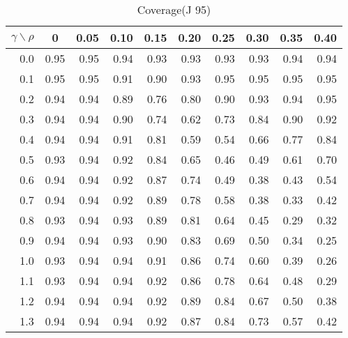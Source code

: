 \documentclass[12pt]{article}
\begin{document}
%
\begin{table}[!tbp]
\caption{Coverage(J 95)}
 \begin{center}
 \begin{tabular}{r|rrrrrrrrr}\hline\hline
\multicolumn{1}{c|}{$\gamma\backslash\rho$}&\multicolumn{1}{c}{0}&\multicolumn{1}{c}{0.05}&\multicolumn{1}{c}{0.10}&\multicolumn{1}{c}{0.15}&\multicolumn{1}{c}{0.20}&\multicolumn{1}{c}{0.25}&\multicolumn{1}{c}{0.30}&\multicolumn{1}{c}{0.35}&\multicolumn{1}{c}{0.40}\tabularnewline
\hline

0.0&0.95&0.95&0.94&0.93&0.93&0.93&0.93&0.94&0.94\tabularnewline
0.1&0.95&0.95&0.91&0.90&0.93&0.95&0.95&0.95&0.95\tabularnewline
0.2&0.94&0.94&0.89&0.76&0.80&0.90&0.93&0.94&0.95\tabularnewline
0.3&0.94&0.94&0.90&0.74&0.62&0.73&0.84&0.90&0.92\tabularnewline
0.4&0.94&0.94&0.91&0.81&0.59&0.54&0.66&0.77&0.84\tabularnewline
0.5&0.93&0.94&0.92&0.84&0.65&0.46&0.49&0.61&0.70\tabularnewline
0.6&0.94&0.94&0.92&0.87&0.74&0.49&0.38&0.43&0.54\tabularnewline
0.7&0.94&0.94&0.92&0.89&0.78&0.58&0.38&0.33&0.42\tabularnewline
0.8&0.93&0.94&0.93&0.89&0.81&0.64&0.45&0.29&0.32\tabularnewline
0.9&0.94&0.94&0.93&0.90&0.83&0.69&0.50&0.34&0.25\tabularnewline
1.0&0.93&0.94&0.94&0.91&0.86&0.74&0.60&0.39&0.26\tabularnewline
1.1&0.93&0.94&0.94&0.92&0.86&0.78&0.64&0.48&0.29\tabularnewline
1.2&0.94&0.94&0.94&0.92&0.89&0.84&0.67&0.50&0.38\tabularnewline
1.3&0.94&0.94&0.94&0.92&0.87&0.84&0.73&0.57&0.42\tabularnewline
\hline
\end{tabular}

\end{center}

\end{table}
\end{document}
